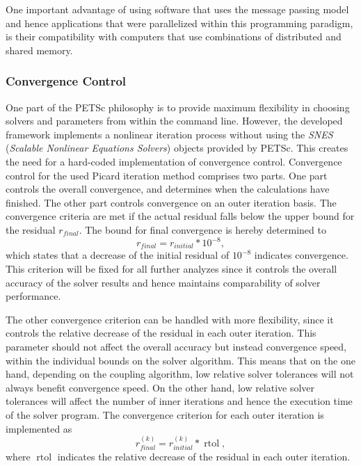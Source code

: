 One important advantage of using software that uses the message passing model and hence applications that were parallelized within this programming paradigm, is their compatibility with computers that use combinations of distributed and shared memory.

\subsubsection{Convergence Control} 
\label{sec:convergence}
One part of the PETSc philosophy is to provide maximum flexibility in choosing solvers and parameters from within the command line. However, the developed framework implements a nonlinear iteration process without using the \emph{SNES} (\emph{Scalable Nonlinear Equations Solvers}) objects provided by PETSc. This creates the need for a hard-coded implementation of convergence control. Convergence control for the used Picard iteration method comprises two parts. One part controls the overall convergence, and determines when the calculations have finished. The other part controls convergence on an outer iteration basis. The convergence criteria are met if the actual residual falls below the upper bound for the residual \(r_{final}\). The bound for final convergence is hereby determined to
\begin{displaymath}
  r_{final} = r_{initial} * 10^{-8},
\end{displaymath}
which states that a decrease of the initial residual of \(10^{-8}\) indicates convergence. This criterion will be fixed for all further analyzes since it controls the overall accuracy of the solver results and hence maintains comparability of solver performance. 

The other convergence criterion can be handled with more flexibility, since it controls the relative decrease of the residual in each outer iteration. This parameter should not affect the overall accuracy but instead convergence speed, within the individual bounds on the solver algorithm. This means that on the one hand, depending on the coupling algorithm, low relative solver tolerances will not always benefit convergence speed. On the other hand, low relative solver tolerances will affect the number of inner iterations and hence the execution time of the solver program. The convergence criterion for each outer iteration is implemented as
\begin{displaymath}
  r_{final}^{(k)} = r_{initial}^{(k)} * \operatorname{rtol},
\end{displaymath}
where \(\operatorname{rtol}\) indicates the relative decrease of the residual in each outer iteration. 

